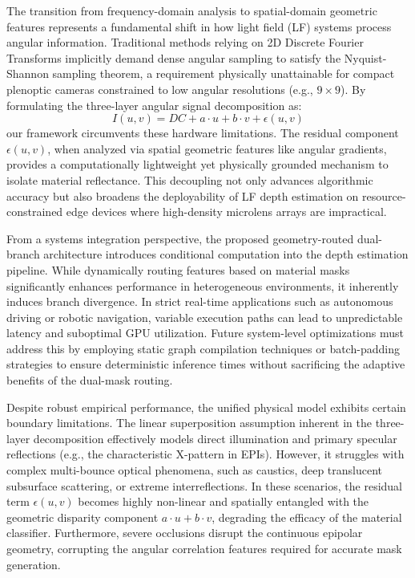 \documentclass[lettersize,journal]{IEEEtran}
\begin{document}
The transition from frequency-domain analysis to spatial-domain geometric features represents a fundamental shift in how light field (LF) systems process angular information. Traditional methods relying on 2D Discrete Fourier Transforms implicitly demand dense angular sampling to satisfy the Nyquist-Shannon sampling theorem, a requirement physically unattainable for compact plenoptic cameras constrained to low angular resolutions (e.g., $9 \times 9$). By formulating the three-layer angular signal decomposition as:
\begin{equation}
I(u,v) = DC + a\cdot u + b\cdot v + \epsilon(u,v)
\end{equation}
our framework circumvents these hardware limitations. The residual component $\epsilon(u,v)$, when analyzed via spatial geometric features like angular gradients, provides a computationally lightweight yet physically grounded mechanism to isolate material reflectance. This decoupling not only advances algorithmic accuracy but also broadens the deployability of LF depth estimation on resource-constrained edge devices where high-density microlens arrays are impractical.

From a systems integration perspective, the proposed geometry-routed dual-branch architecture introduces conditional computation into the depth estimation pipeline. While dynamically routing features based on material masks significantly enhances performance in heterogeneous environments, it inherently induces branch divergence. In strict real-time applications such as autonomous driving or robotic navigation, variable execution paths can lead to unpredictable latency and suboptimal GPU utilization. Future system-level optimizations must address this by employing static graph compilation techniques or batch-padding strategies to ensure deterministic inference times without sacrificing the adaptive benefits of the dual-mask routing.

Despite robust empirical performance, the unified physical model exhibits certain boundary limitations. The linear superposition assumption inherent in the three-layer decomposition effectively models direct illumination and primary specular reflections (e.g., the characteristic X-pattern in EPIs). However, it struggles with complex multi-bounce optical phenomena, such as caustics, deep translucent subsurface scattering, or extreme interreflections. In these scenarios, the residual term $\epsilon(u,v)$ becomes highly non-linear and spatially entangled with the geometric disparity component $a\cdot u + b\cdot v$, degrading the efficacy of the material classifier. Furthermore, severe occlusions disrupt the continuous epipolar geometry, corrupting the angular correlation features required for accurate mask generation.
\end{document}
